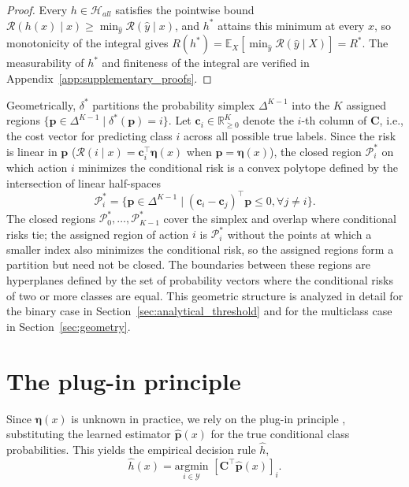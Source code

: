 \begin{proof}
Every $h \in \mathcal{H}_{all}$ satisfies the pointwise bound $\mathcal{R}(h(x) \mid x) \geq \min_{\hat{y}} \mathcal{R}(\hat{y} \mid x)$, and $h^*$ attains this minimum at every $x$, so monotonicity of the integral gives $R(h^*) = \mathbb{E}_X[\min_{\hat{y}} \mathcal{R}(\hat{y} \mid X)] = R^*$. The measurability of $h^*$ and finiteness of the integral are verified in Appendix~\ref{app:supplementary_proofs}.
\end{proof}

Geometrically, $\delta^*$ partitions the probability simplex $\Delta^{K-1}$ into the $K$ assigned regions $\{ \mathbf{p} \in \Delta^{K-1} \mid \delta^*(\mathbf{p}) = i \}$. Let $\mathbf{c}_i \in \mathbb{R}_{\geq 0}^K$ denote the $i$-th column of $\mathbf{C}$, i.e., the cost vector for predicting class $i$ across all possible true labels. Since the risk is linear in $\mathbf{p}$ ($\mathcal{R}(i \mid x) = \mathbf{c}_i^\top \boldsymbol{\eta}(x)$ when $\mathbf{p} = \boldsymbol{\eta}(x)$), the closed region $\mathcal{P}_i^*$ on which action $i$ minimizes the conditional risk is a convex polytope defined by the intersection of linear half-spaces
\begin{equation}\label{eq:bayes_regions}
    \mathcal{P}_i^* = \{ \mathbf{p} \in \Delta^{K-1} \mid (\mathbf{c}_i - \mathbf{c}_j)^\top \mathbf{p} \leq 0, \forall j \neq i \}.
\end{equation}
The closed regions $\mathcal{P}_0^*, \dots, \mathcal{P}_{K-1}^*$ cover the simplex and overlap where conditional risks tie; the assigned region of action $i$ is $\mathcal{P}_i^*$ without the points at which a smaller index also minimizes the conditional risk, so the assigned regions form a partition but need not be closed. The boundaries between these regions are hyperplanes defined by the set of probability vectors where the conditional risks of two or more classes are equal. This geometric structure is analyzed in detail for the binary case in Section~\ref{sec:analytical_threshold} and for the multiclass case in Section~\ref{sec:geometry}.

\section{The plug-in principle}

Since $\boldsymbol{\eta}(x)$ is unknown in practice, we rely on the plug-in principle \citep{devroye1996probabilistic}, substituting the learned estimator $\hat{\mathbf{p}}(x)$ for the true conditional class probabilities. This yields the empirical decision rule $\hat{h}$,
\begin{equation}\label{argmin_risk}
    \hat{h}(x) = \underset{i \in \mathcal{Y}}{\mathrm{argmin}} \,\, [\mathbf{C}^\top \hat{\mathbf{p}}(x)]_i.
\end{equation}

